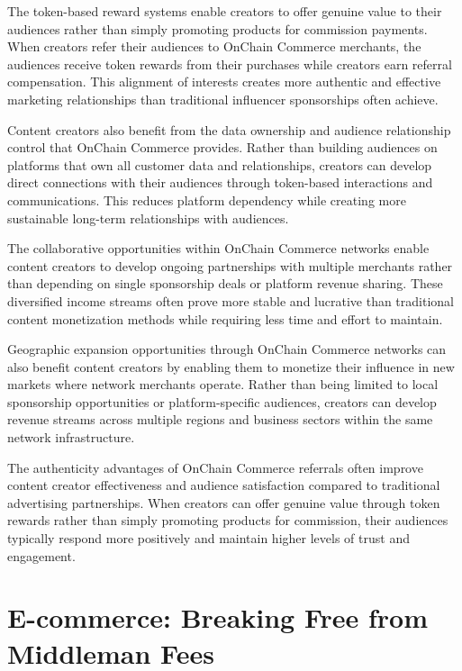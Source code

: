 \documentclass[
  Letterpaper,
]{scrbook}
\begin{document}
The token-based reward systems enable creators to offer genuine value to
their audiences rather than simply promoting products for commission
payments. When creators refer their audiences to OnChain Commerce
merchants, the audiences receive token rewards from their purchases
while creators earn referral compensation. This alignment of interests
creates more authentic and effective marketing relationships than
traditional influencer sponsorships often achieve.

Content creators also benefit from the data ownership and audience
relationship control that OnChain Commerce provides. Rather than
building audiences on platforms that own all customer data and
relationships, creators can develop direct connections with their
audiences through token-based interactions and communications. This
reduces platform dependency while creating more sustainable long-term
relationships with audiences.

The collaborative opportunities within OnChain Commerce networks enable
content creators to develop ongoing partnerships with multiple merchants
rather than depending on single sponsorship deals or platform revenue
sharing. These diversified income streams often prove more stable and
lucrative than traditional content monetization methods while requiring
less time and effort to maintain.

Geographic expansion opportunities through OnChain Commerce networks can
also benefit content creators by enabling them to monetize their
influence in new markets where network merchants operate. Rather than
being limited to local sponsorship opportunities or platform-specific
audiences, creators can develop revenue streams across multiple regions
and business sectors within the same network infrastructure.

The authenticity advantages of OnChain Commerce referrals often improve
content creator effectiveness and audience satisfaction compared to
traditional advertising partnerships. When creators can offer genuine
value through token rewards rather than simply promoting products for
commission, their audiences typically respond more positively and
maintain higher levels of trust and engagement.

\section{E-commerce: Breaking Free from Middleman
Fees}\label{e-commerce-breaking-free-from-middleman-fees}
\end{document}
